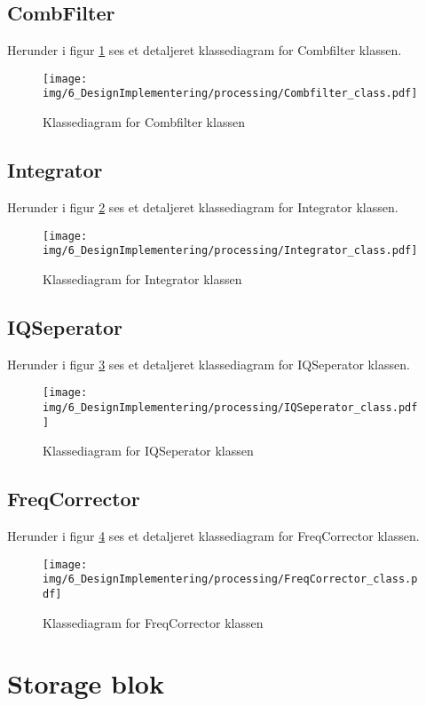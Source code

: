 \begin{appendices}
\pagebreak
\subsection{CombFilter}
Herunder i figur \ref{fig:Combfilter_class} ses et detaljeret klassediagram for Combfilter klassen.
\begin{figure}[H]
	\centering
	\texttt{[image: img/6\_DesignImplementering/processing/Combfilter\_class.pdf]}
	\caption{Klassediagram for Combfilter klassen}
	\label{fig:Combfilter_class}
\end{figure}
\pagebreak

\pagebreak
\subsection{Integrator}
Herunder i figur \ref{fig:Integrator_class} ses et detaljeret klassediagram for Integrator klassen.
\begin{figure}[H]
	\centering
	\texttt{[image: img/6\_DesignImplementering/processing/Integrator\_class.pdf]}
	\caption{Klassediagram for Integrator klassen}
	\label{fig:Integrator_class}
\end{figure}

\pagebreak
\subsection{IQSeperator}
Herunder i figur \ref{fig:IQSeperator_class} ses et detaljeret klassediagram for IQSeperator klassen.
\begin{figure}[H]
	\centering
	\texttt{[image: img/6\_DesignImplementering/processing/IQSeperator\_class.pdf]}
	\caption{Klassediagram for IQSeperator klassen}
	\label{fig:IQSeperator_class}
\end{figure}
\pagebreak

\subsection{FreqCorrector}
Herunder i figur \ref{fig:FreqCorrector_class} ses et detaljeret klassediagram for FreqCorrector klassen.
\begin{figure}[H]
	\centering
	\texttt{[image: img/6\_DesignImplementering/processing/FreqCorrector\_class.pdf]}
	\caption{Klassediagram for FreqCorrector klassen}
	\label{fig:FreqCorrector_class}
\end{figure}
\pagebreak

\section{Storage blok}


\end{appendices}

